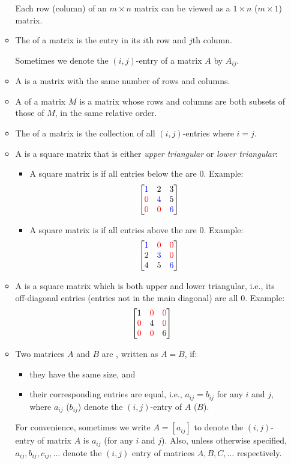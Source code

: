 \begin{enumerate}
\begin{itemize}
\begin{note}
Each row (column) of an \(m\times n\) matrix can be viewed as a \(1\times n\)
(\(m\times 1\)) matrix.
\end{note}
\item The  of a matrix is the entry in its \(i\)th row
and \(j\)th column. \begin{note}
Sometimes we denote the \((i,j)\)-entry of a matrix \(A\) by \(A_{ij}\).
\end{note}
\item A  is a matrix with the same number of rows and columns.
\item A  of a matrix \(M\) is a matrix whose rows and columns
are both subsets of those of \(M\), in the same relative order.
\item The  of a matrix is the collection of all
\((i,j)\)-entries where \(i=j\).
\item A  is a square matrix that is either \emph{upper
triangular} or \emph{lower triangular}:
\begin{itemize}
\item A square matrix is  if all entries below the  are \(0\). Example:
\[
\mqty[\blc{1}&2&3\\ \rc{0}&\blc{4}&5\\ \rc{0}&\rc{0}&\blc{6}]
\]
\item A square matrix is  if all entries above the  are \(0\). Example:
\[
\mqty[\blc{1}&\rc{0}&\rc{0}\\2&\blc{3}&\rc{0}\\ 4&5&\blc{6}]
\]
\end{itemize}
\item A  is a square matrix which is both upper and lower
triangular, i.e., its off-diagonal entries (entries not in the main diagonal)
are all \(0\).
Example:
\[
\mqty[1&\rc{0}&\rc{0}\\ \rc{0}&4&\rc{0}\\ \rc{0}&\rc{0}&6]
\]
\item Two matrices \(A\) and \(B\) are , written as \(A=B\), if:
\begin{itemize}
\item they have the same size, and
\item their corresponding entries are equal, i.e., \(a_{ij}=b_{ij}\) for any
\(i\) and \(j\), where \(a_{ij}\) (\(b_{ij}\)) denote the \((i,j)\)-entry of
\(A\) (\(B\)).
\end{itemize}
\begin{note}
For convenience, sometimes we write \(A=[a_{ij}]\) to denote the
\((i,j)\)-entry of matrix \(A\) is \(a_{ij}\) (for any \(i\) and \(j\)). Also,
unless otherwise specified, \(a_{ij},b_{ij},c_{ij},\dotsc\) denote the
\((i,j)\) entry of matrices \(A,B,C,\dotsc\) respectively.
\end{note}
\end{itemize}
\end{enumerate}
